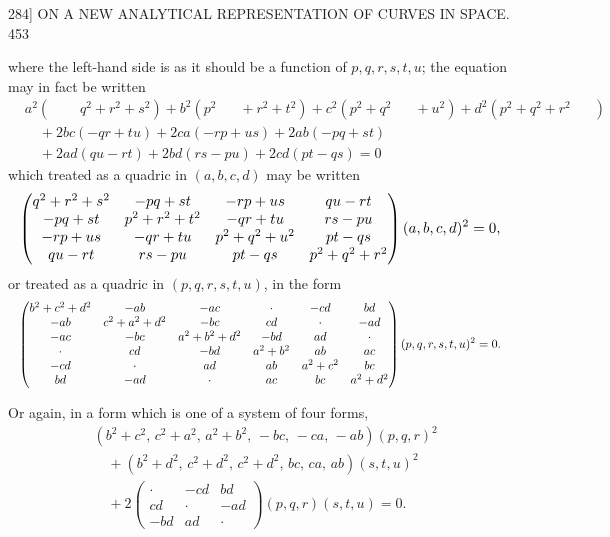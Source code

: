\documentclass[11pt]{article}
\begin{document}
\begin{center}
\textsc{284]} \hfill ON A NEW ANALYTICAL REPRESENTATION OF CURVES IN SPACE. \hfill 453
\end{center}

where the left-hand side is as it should be a function of $p,q,r,s,t,u$; the equation
may in fact be written
\begin{align*}
&a^{2}(\phantom{p^{2}+}q^{2}+r^{2}+s^{2})
+b^{2}(p^{2}\phantom{+q^{2}}+r^{2}+t^{2})
+c^{2}(p^{2}+q^{2}\phantom{+r^{2}}+u^{2})
+d^{2}(p^{2}+q^{2}+r^{2}\phantom{+s^{2}})\\
&\quad +2bc(-qr+tu)+2ca(-rp+us)+2ab(-pq+st)\\
&\quad +2ad(qu-rt)+2bd(rs-pu)+2cd(pt-qs)=0
\end{align*}
which treated as a quadric in $(a,b,c,d)$ may be written
\[ \resizebox{\textwidth}{!}{$\displaystyle
\begin{pmatrix}
q^{2}+r^{2}+s^{2} & -pq+st & -rp+us & qu-rt \\
-pq+st & p^{2}+r^{2}+t^{2} & -qr+tu & rs-pu \\
-rp+us & -qr+tu & p^{2}+q^{2}+u^{2} & pt-qs \\
qu-rt & rs-pu & pt-qs & p^{2}+q^{2}+r^{2}
\end{pmatrix}(a,b,c,d)^{2}=0,
$} \]
or treated as a quadric in $(p,q,r,s,t,u)$, in the form
\[ \resizebox{\textwidth}{!}{$\displaystyle
\begin{pmatrix}
b^{2}+c^{2}+d^{2} & -ab & -ac & \cdot & -cd & bd \\
-ab & c^{2}+a^{2}+d^{2} & -bc & cd & \cdot & -ad \\
-ac & -bc & a^{2}+b^{2}+d^{2} & -bd & ad & \cdot \\
\cdot & cd & -bd & a^{2}+b^{2} & ab & ac \\
-cd & \cdot & ad & ab & a^{2}+c^{2} & bc \\
bd & -ad & \cdot & ac & bc & a^{2}+d^{2}
\end{pmatrix}(p,q,r,s,t,u)^{2}=0.
$} \]

Or again, in a form which is one of a system of four forms,
\begin{align*}
&(b^{2}+c^{2},\, c^{2}+a^{2},\, a^{2}+b^{2},\, -bc,\, -ca,\, -ab)(p,q,r)^{2}\\
&\quad +(b^{2}+d^{2},\, c^{2}+d^{2},\, c^{2}+d^{2},\, bc,\, ca,\, ab)(s,t,u)^{2}\\
&\quad +2\begin{pmatrix} \cdot & -cd & bd \\ cd & \cdot & -ad \\ -bd & ad & \cdot \end{pmatrix}\!(p,q,r)(s,t,u)=0.
\end{align*}
\end{document}
